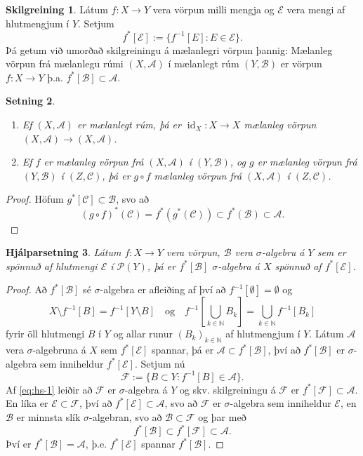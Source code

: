 \documentclass[a4paper,icelandic,11pt]{book}
\theoremstyle{plain}      \newtheorem{setn}{Setning}[chapter]
\newtheorem{lemma}[setn]{Hjálparsetning}
\theoremstyle{definition} \newtheorem{skilgr}[setn]{Skilgreining}
\theoremstyle{remark}     \newtheorem*{ath}{Athugasemd}
\newcommand{\N}{\mathbb N}
\DeclareMathOperator{\id}{id}
\begin{document}
\begin{skilgr}
  Látum $f:X\to Y$ vera vörpun milli mengja og $\mathcal E$ vera mengi
  af hlutmengjum í $Y$. Setjum
  \[
  f^{*}[\mathcal E] := \{ f^{-1}[E] : E\in\mathcal E \}.
  \]
  Þá getum við umorðað skilgreiningu á mælanlegri vörpun þannig:
  Mælanleg vörpun frá mælanlegu rúmi $(X,\mathcal A)$ í mælanlegt rúm
  $(Y,\mathcal B)$ er vörpun $f:X\to Y$ þ.a.
  $f^{*}[\mathcal{B}]\subset{\mathcal A}$.
\end{skilgr}
\begin{setn}
  \begin{enumerate}[(1)]
  \item Ef $(X,\mathcal A)$ er mælanlegt rúm, þá er $\id_{X}:X\to X$
    mælanleg  vörpun $(X,\mathcal A)\to(X,\mathcal A)$.
  \item Ef $f$ er mælanleg vörpun frá $(X,\mathcal A)$ í
    $(Y,\mathcal{B})$, og $g$ er mælanleg vörpun frá $(Y,\mathcal{B})$
    í $(Z,\mathcal{C})$, þá er $g\circ f$ mælanleg vörpun frá
    $(X,\mathcal{A})$ í $(Z,\mathcal{C})$.
  \end{enumerate}
\end{setn}
\begin{proof}
  Höfum $g^{*}[\mathcal C]\subset\mathcal B$, svo að
  \[
  (g\circ{f})^{*}(\mathcal{C})
  = f^{*}(g^{*}(\mathcal{C}))\subset{f^{*}(\mathcal{B})}
  \subset \mathcal A.
  \]
\end{proof}
\begin{lemma}
  Látum $f:X\to Y$ vera vörpun, $\mathcal B$ vera $\sigma$-algebru á
  $Y$ sem er spönnuð af hlutmengi $\mathcal E$ í $\mathcal P(Y)$, þá
  er $f^{*}[\mathcal B]$ $\sigma$-algebra á $X$ spönnuð af
  $f^{*}[\mathcal E]$.
\end{lemma}
\begin{proof}
  Að $f^{*}[\mathcal B]$ sé $\sigma$-algebra er afleiðing af því að
  $f^{-1}[\emptyset]=\emptyset$ og
  \begin{equation}
    \label{eq:hs-1}
    X\setminus f^{-1}[B]
    = f^{-1}[Y\setminus B]
    \quad\text{og}\quad
    f^{-1}[\bigcup_{k\in\N} B_{k}]
    = \bigcup_{k\in\N}f^{-1}[B_{k}]
  \end{equation}
  fyrir öll hlutmengi $B$ í $Y$ og allar runur $(B_{k})_{k\in\N}$ af
  hlutmengjum í $Y$. Látum $\mathcal A$ vera $\sigma$-algebruna á $X$
  sem $f^{*}[\mathcal E]$ spannar, þá er
  $\mathcal{A}\subset{f^{*}[\mathcal{B}]}$, því að
  $f^{*}[\mathcal{B}]$ er $\sigma$-algebra sem inniheldur
  $f^{*}[\mathcal{E}]$. Setjum nú
  \[
  \mathcal F := \{
    B\subset Y : f^{-1}[B]\in\mathcal A
  \}.
  \]
  Af \eqref{eq:hs-1} leiðir að $\mathcal F$ er $\sigma$-algebra á $Y$
  og skv. skilgreiningu á $\mathcal F$ er
  $f^{*}[\mathcal{F}]\subset\mathcal{A}$. En líka er
  $\mathcal{E}\subset\mathcal{F}$, því að
  $f^{*}[\mathcal{E}]\subset\mathcal{A}$, svo að $\mathcal{F}$ er
  $\sigma$-algebra sem inniheldur $\mathcal{E}$, en $\mathcal{B}$ er
  minnsta slík $\sigma$-algebran, svo að
  $\mathcal{B}\subset\mathcal{F}$ og þar með
  \[
  f^{*}[\mathcal{B}]
  \subset f^{*}[\mathcal{F}]
  \subset \mathcal A.
  \]
  Því er $f^{*}[\mathcal B] = \mathcal A$, þ.e. $f^{*}[\mathcal{E}]$
  spannar $f^{*}[\mathcal{B}]$. 
\end{proof}
\end{document}
